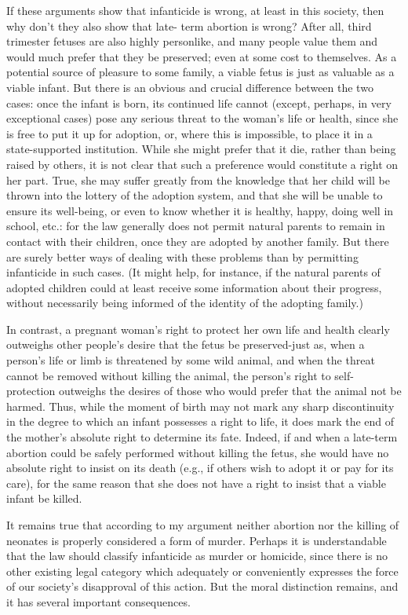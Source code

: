 If these arguments show that infanticide is wrong, at least
in this society, then why don’t they also show that late-
term abortion is wrong? After all, third trimester fetuses
are also highly personlike, and many people value them
and would much prefer that they be preserved; even at
some cost to themselves. As a potential source of pleasure
to some family, a viable fetus is just as valuable as a
viable infant. But there is an obvious and crucial
difference between the two cases: once the infant is born,
its continued life cannot (except, perhaps, in very
exceptional cases) pose any serious threat to the woman’s
life or health, since she is free to put it up for adoption, or,
where this is impossible, to place it in a state-supported
institution. While she might prefer that it die, rather than
being raised by others, it is not clear that such a
preference would constitute a right on her part. True, she
may suffer greatly from the knowledge that her child will
be thrown into the lottery of the adoption system, and that
she will be unable to ensure its well-being, or even to
know whether it is healthy, happy, doing well in school,
etc.: for the law generally does not permit natural parents
to remain in contact with their children, once they are
adopted by another family. But there are surely better
ways of dealing with these problems than by permitting
infanticide in such cases. (It might help, for instance, if
the natural parents of adopted children could at least
receive some information about their progress, without
necessarily being informed of the identity of the adopting
family.)

In contrast, a pregnant woman’s right to protect her own
life and health clearly outweighs other people’s desire that
the fetus be preserved-just as, when a person’s life or limb
is threatened by some wild animal, and when the threat
cannot be removed without killing the animal, the
person’s right to self-protection outweighs the desires of
those who would prefer that the animal not be harmed.
Thus, while the moment of birth may not mark any sharp
discontinuity in the degree to which an infant possesses a
right to life, it does mark the end of the mother’s absolute
right to determine its fate. Indeed, if and when a late-term
abortion could be safely performed without killing the
fetus, she would have no absolute right to insist on its
death (e.g., if others wish to adopt it or pay for its care),
for the same reason that she does not have a right to insist
that a viable infant be killed.

It remains true that according to my argument neither
abortion nor the killing of neonates is properly considered
a form of murder. Perhaps it is understandable that the
law should classify infanticide as murder or homicide,
since there is no other existing legal category which
adequately or conveniently expresses the force of our
society’s disapproval of this action. But the moral
distinction remains, and it has several important
consequences.

